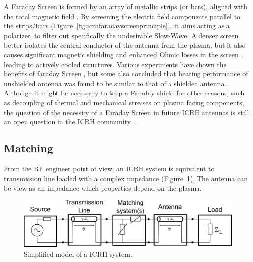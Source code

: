 A Faraday Screen is formed by an array of metallic strips (or bars), aligned with the total magnetic field . By screening the electric field components parallel to the strips/bars (Figure~\ref{fig:icrhfaradayscreenprinciple}), it aims acting as a polarizer, to filter out specifically the undesirable Slow-Wave. A denser screen better isolates the central conductor of the antenna from the plasma, but it also causes significant magnetic shielding and enhanced Ohmic losses in the screen , leading to actively cooled structures. Various experiments have shown the benefits of faraday Screen , but some also concluded that heating performance of unshielded antenna was found to be similar to that of a shielded antenna .  Although it might be necessary to keep a Faraday shield for other reasons, such as decoupling of thermal and mechanical stresses on plasma facing components, the question of the necessity of a Faraday Screen in future ICRH antennas is still an open question in the ICRH community . 



\subsection{Matching}\label{sec:ICRH_matching_systems}
From the RF engineer point of view, an ICRH system is equivalent to transmission line loaded with a complex impedance (Figure~\ref{fig:icrhantennacircuitmodel}). The antenna can be view as an impedance which properties depend on the plasma. 

\begin{figure}[h]
	\centering
	\includegraphics[width=0.9\linewidth]{figures/chap3/ICRH_antenna_circuit_model}
	\caption{Simplified model of a ICRH system.}
	\label{fig:icrhantennacircuitmodel}
\end{figure}

